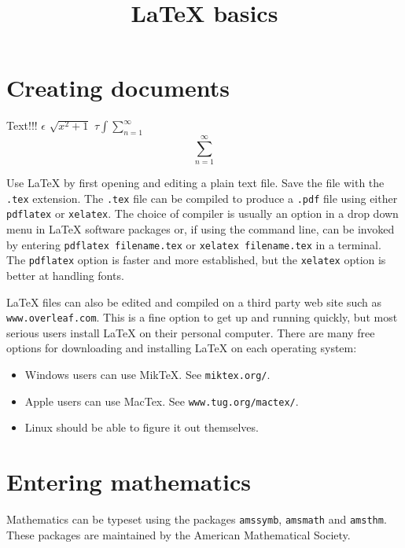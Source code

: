 \documentclass[11pt]{article}
\title{\LaTeX{} basics}
\date{}
\begin{document}
\maketitle

\section{Creating documents}

Text!!! $\epsilon$
$\sqrt{x^2+1}$
\( \tau \int  \sum_{ n = 1 }^{ \infty} \)
\begin{equation*}
\sum_{ n = 1 }^{ \infty}
\end{equation*}

Use \LaTeX{} by first opening and editing a plain text file.  Save the file with the
\texttt{.tex} extension.  The \texttt{.tex} file can be compiled to produce a
\texttt{.pdf} file using either \texttt{pdflatex} or \texttt{xelatex}.  The choice of
compiler is usually an option in a drop down menu in \LaTeX{} software packages or, if
using the command line, can be invoked by entering \texttt{pdflatex filename.tex} or
\texttt{xelatex filename.tex} in a terminal.  The \texttt{pdflatex} option is faster and
more established, but the \texttt{xelatex} option is better at handling fonts.

\LaTeX{} files can also be edited and compiled on a third party web site such as
\texttt{www.overleaf.com}.  This is a fine option to get up and running quickly, but most
serious users install LaTeX on their personal computer.  There are many free options for
downloading and installing \LaTeX{} on each operating system:
\begin{itemize}
\item Windows users can use MikTeX.  See
  \texttt{miktex.org/}.

\item Apple users can use MacTex.  See
  \texttt{www.tug.org/mactex/}.

\item Linux should be able to figure it out themselves.
\end{itemize}

\section{Entering mathematics}

Mathematics can be typeset using the packages \texttt{amssymb},
\texttt{amsmath} and \texttt{amsthm}.  These packages are maintained by the
American Mathematical Society.
\end{document}
